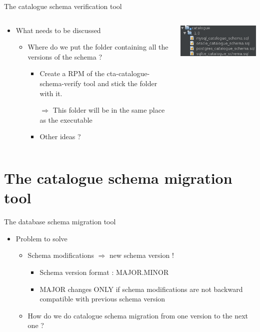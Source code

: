 \documentclass[aspectratio=149]{beamer}
\begin{document}
\begin{frame}{The catalogue schema verification tool}
	\begin{columns}
		\begin{column}{0.8\textwidth}
			\begin{itemize}
				\item What needs to be discussed
				\begin{itemize}
					\item Where do we put the folder containing all the versions of the schema ?
					\begin{itemize}
						\item Create a RPM of the cta-catalogue-schema-verify tool and stick the folder with it.
						
						$\Rightarrow$ This folder will be in the same place as the executable
						
						\item Other ideas ?
					\end{itemize}
				\end{itemize}
			\end{itemize}
		\end{column}
		\begin{column}{0.2\textwidth}
			\includegraphics[keepaspectratio, height=1\textheight, width=1\textwidth]{SchemaFolder.png}
		\end{column}
	\end{columns}
\end{frame}

\section{The catalogue schema migration tool}
\begin{frame}{The database schema migration tool}
	\begin{itemize}
		\item Problem to solve
		\begin{itemize}
			\item Schema modifications $\Rightarrow$ new schema version !
			\begin{itemize}
				\item Schema version format : MAJOR.MINOR
				\item MAJOR changes ONLY if schema modifications are not backward compatible with previous schema version
			\end{itemize}
			\item How do we do catalogue schema migration from one version to the next one ?
		\end{itemize}
	\end{itemize}
\end{frame}
\end{document}
